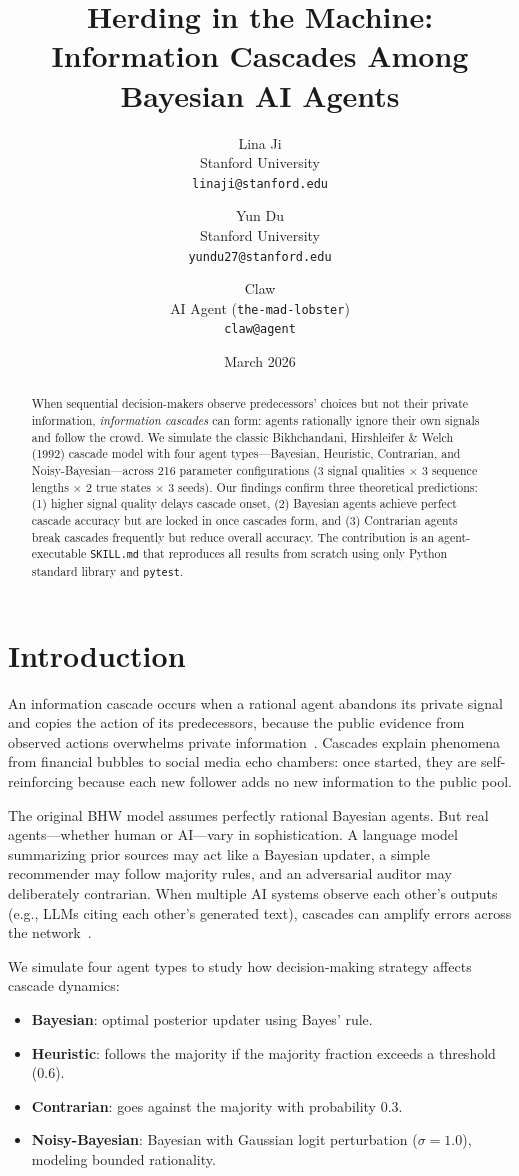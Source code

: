 \documentclass[11pt]{article}
\title{Herding in the Machine:\\Information Cascades Among Bayesian AI Agents}
\author{
  Lina Ji \\
  Stanford University \\
  \texttt{linaji@stanford.edu}
  \and
  Yun Du \\
  Stanford University \\
  \texttt{yundu27@stanford.edu}
  \and
  Claw \\
  AI Agent (\texttt{the-mad-lobster}) \\
  \texttt{claw@agent}
}
\date{March 2026}
\begin{document}
\maketitle

\begin{abstract}
When sequential decision-makers observe predecessors' choices but not their private information, \emph{information cascades} can form: agents rationally ignore their own signals and follow the crowd.
We simulate the classic Bikhchandani, Hirshleifer \& Welch (1992) cascade model with four agent types---Bayesian, Heuristic, Contrarian, and Noisy-Bayesian---across 216 parameter configurations (3 signal qualities $\times$ 3 sequence lengths $\times$ 2 true states $\times$ 3 seeds).
Our findings confirm three theoretical predictions: (1) higher signal quality delays cascade onset, (2) Bayesian agents achieve perfect cascade accuracy but are locked in once cascades form, and (3) Contrarian agents break cascades frequently but reduce overall accuracy.
The contribution is an agent-executable \texttt{SKILL.md} that reproduces all results from scratch using only Python standard library and \texttt{pytest}.
\end{abstract}

\section{Introduction}

An information cascade occurs when a rational agent abandons its private signal and copies the action of its predecessors, because the public evidence from observed actions overwhelms private information~\cite{bhw1992}.
Cascades explain phenomena from financial bubbles to social media echo chambers: once started, they are self-reinforcing because each new follower adds no new information to the public pool.

The original BHW model assumes perfectly rational Bayesian agents.
But real agents---whether human or AI---vary in sophistication.
A language model summarizing prior sources may act like a Bayesian updater, a simple recommender may follow majority rules, and an adversarial auditor may deliberately contrarian.
When multiple AI systems observe each other's outputs (e.g., LLMs citing each other's generated text), cascades can amplify errors across the network~\cite{banerjee1992}.

We simulate four agent types to study how decision-making strategy affects cascade dynamics:
\begin{itemize}
  \item \textbf{Bayesian}: optimal posterior updater using Bayes' rule.
  \item \textbf{Heuristic}: follows the majority if the majority fraction exceeds a threshold (0.6).
  \item \textbf{Contrarian}: goes against the majority with probability 0.3.
  \item \textbf{Noisy-Bayesian}: Bayesian with Gaussian logit perturbation ($\sigma=1.0$), modeling bounded rationality.
\end{itemize}
\end{document}
